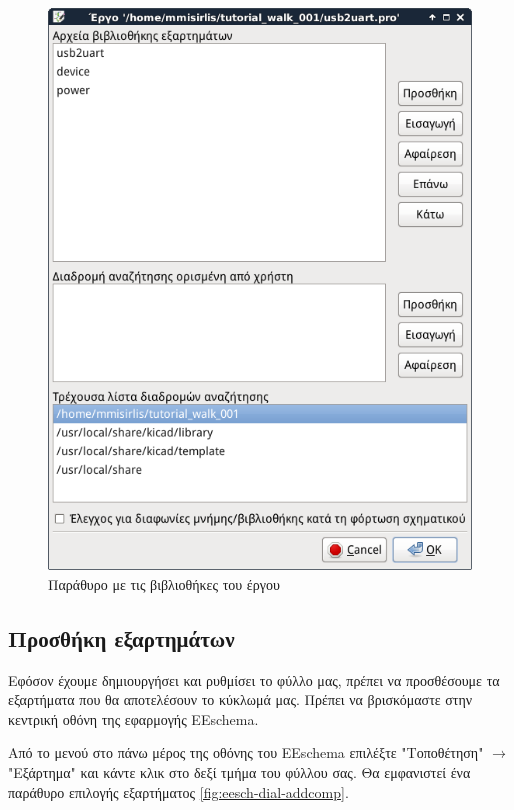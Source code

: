\documentclass[a4paper]{article}
\begin{document}
\begin{figure}
  \begin{center}
    \includegraphics[width=.9\textwidth]{img/eesch-dial-libr.png}
    \caption{Παράθυρο με τις βιβλιοθήκες του έργου}
    \label{fig:eesch-dial-libr}
  \end{center}
\end{figure}


\subsection{Προσθήκη εξαρτημάτων}
Εφόσον έχουμε δημιουργήσει και ρυθμίσει το φύλλο μας, πρέπει να προσθέσουμε τα εξαρτήματα που θα αποτελέσουν το κύκλωμά μας. Πρέπει να βρισκόμαστε στην κεντρική οθόνη της εφαρμογής \textenglish{EEschema}.

Από το μενού στο πάνω μέρος της οθόνης του \textenglish{EEschema} επιλέξτε "Τοποθέτηση" $\rightarrow$ "Εξάρτημα" και κάντε κλικ στο δεξί τμήμα του φύλλου σας. Θα εμφανιστεί ένα παράθυρο επιλογής εξαρτήματος \ref{fig:eesch-dial-addcomp}.
\end{document}
